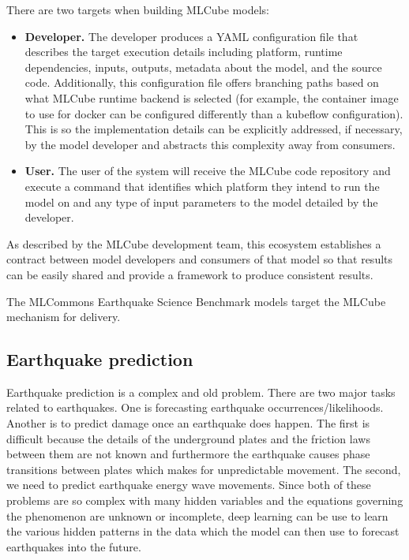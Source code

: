 \documentclass[sigplan,screen]{acmart}
\providecommand{\mlcube}{MLCube}
\begin{document}
There are two targets when building \mlcube{} models:

\begin{itemize}
  
    \item \textbf{Developer.}  The developer produces a YAML
      configuration file that describes the target execution details
      including platform, runtime dependencies, inputs, outputs,
      metadata about the model, and the source code.  Additionally,
      this configuration file offers branching paths based on what
      \mlcube{} runtime backend is selected (for example, the
      container image to use for docker can be configured differently
      than a kubeflow configuration).  This is so the implementation
      details can be explicitly addressed, if necessary, by the model
      developer and abstracts this complexity away from consumers.

    \item \textbf{User.}  The user of the system will receive the
      \mlcube{} code repository and execute a command that identifies
      which platform they intend to run the model on and any type of
      input parameters to the model detailed by the developer.
\end{itemize}

As described by the \mlcube{} development team, this ecosystem
establishes a contract between model developers and consumers of that
model so that results can be easily shared and provide a framework to
produce consistent results.

The MLCommons Earthquake Science Benchmark models target the \mlcube{}
mechanism for delivery.

\subsection{Earthquake prediction}

Earthquake prediction is a complex and old problem. There are two
major tasks related to earthquakes. One is forecasting earthquake
occurrences/likelihoods. Another is to predict damage once an
earthquake does happen. The first is difficult because the details of
the underground plates and the friction laws between them are not
known and furthermore the earthquake causes phase transitions between
plates which makes for unpredictable movement. The second, we need to
predict earthquake energy wave movements. Since both of these problems
are so complex with many hidden variables and the equations governing
the phenomenon are unknown or incomplete, deep learning can be use to
learn the various hidden patterns in the data which the model can then
use to forecast earthquakes into the future. \cite{fox2021earthquake}
\end{document}
